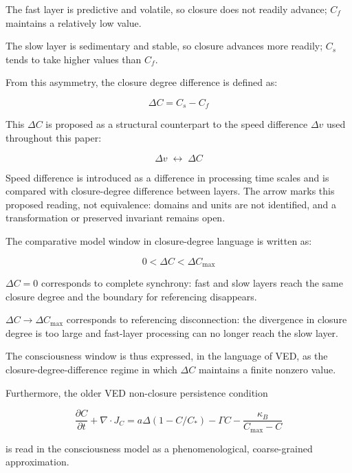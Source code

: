 The fast layer is predictive and volatile, so closure does not readily advance; $C_f$ maintains a relatively low value.

The slow layer is sedimentary and stable, so closure advances more readily; $C_s$ tends to take higher values than $C_f$.

From this asymmetry, the closure degree difference is defined as:

\begin{equation}
\Delta C = C_s - C_f
\end{equation}

This $\Delta C$ is proposed as a structural counterpart to the speed difference $\Delta v$ used throughout this paper:

\begin{equation}
\Delta v \;\leftrightarrow\; \Delta C
\end{equation}

Speed difference is introduced as a difference in processing time scales and is compared with closure-degree difference between layers. The arrow marks this proposed reading, not equivalence: domains and units are not identified, and a transformation or preserved invariant remains open.

The comparative model window in closure-degree language is written as:

\begin{equation}
0 < \Delta C < \Delta C_{\max}
\end{equation}

$\Delta C = 0$ corresponds to complete synchrony: fast and slow layers reach the same closure degree and the boundary for referencing disappears.

$\Delta C \to \Delta C_{\max}$ corresponds to referencing disconnection: the divergence in closure degree is too large and fast-layer processing can no longer reach the slow layer.

The consciousness window is thus expressed, in the language of VED, as the closure-degree-difference regime in which $\Delta C$ maintains a finite nonzero value.

Furthermore, the older VED non-closure persistence condition

\begin{equation}
\frac{\partial C}{\partial t} + \nabla \cdot J_C = a\Delta\!\left(1 - C/C_*\right) - \Gamma C - \frac{\kappa_B}{C_{\max} - C}
\end{equation}

is read in the consciousness model as a phenomenological, coarse-grained approximation.

